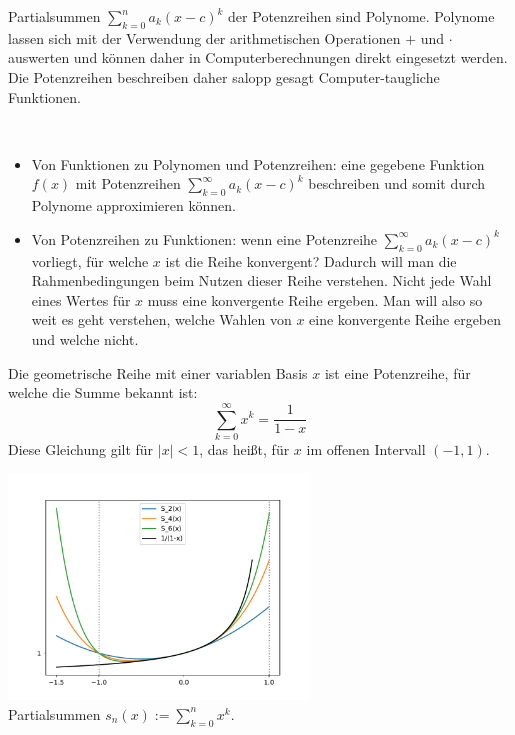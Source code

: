 \begin{bem}
	Partialsummen $\sum_{k=0}^n a_k (x-c)^k$ der Potenzreihen sind Polynome. Polynome lassen sich mit der Verwendung der arithmetischen Operationen $+$ und $\cdot$ auswerten und können daher in Computerberechnungen direkt eingesetzt werden. Die Potenzreihen beschreiben daher salopp gesagt Computer-taugliche Funktionen. 
\end{bem} 


\begin{bem} \ 
	\begin{itemize}
			\item Von Funktionen zu Polynomen und Potenzreihen: eine gegebene Funktion $f(x)$  mit Potenzreihen $\sum_{k=0}^\infty a_k (x-c)^k$ beschreiben und somit durch Polynome approximieren können. 
			\item Von Potenzreihen zu Funktionen: wenn eine Potenzreihe $\sum_{k=0}^\infty a_k (x-c)^k$ vorliegt, für welche $x$ ist die Reihe  konvergent? Dadurch will man die Rahmenbedingungen beim Nutzen dieser Reihe verstehen. Nicht jede Wahl eines Wertes für $x$ muss eine konvergente Reihe ergeben. Man will also so weit es geht verstehen, welche Wahlen von $x$ eine konvergente Reihe ergeben und welche nicht. 
	\end{itemize} 
\end{bem} 


\begin{bsp} 
	Die geometrische Reihe mit einer variablen Basis $x$ ist eine Potenzreihe, für welche die Summe bekannt ist: 
	\[
		\sum_{k=0}^\infty x^k = \frac{1}{1-x}
	\]
	Diese Gleichung gilt für $|x| < 1$, das heißt, für $x$ im offenen Intervall $(-1,1)$. 

	\begin{center}
	\includegraphics[width=0.6\textwidth]{pics/potenzreihe.pdf}
	\\ Partialsummen $s_n(x) := \sum_{k=0}^n x^k$.
	\end{center}
\end{bsp} 

